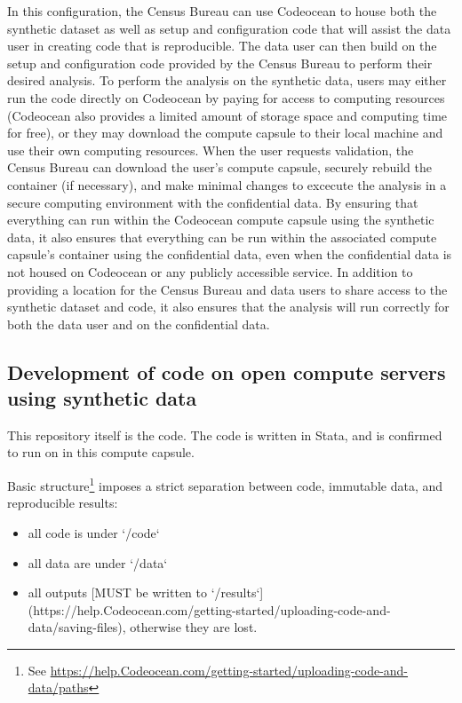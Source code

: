 \documentclass[]{hdsr}
\begin{document}
In this configuration, the Census Bureau can use Codeocean to house both the synthetic dataset as well as
setup and configuration code that will assist the data user in creating code that is reproducible. The data
user can then build on the setup and configuration code provided by the Census Bureau to perform their
desired analysis. To perform the analysis on the synthetic data, users may either run the code directly on
Codeocean by paying for access to computing resources (Codeocean also provides a limited amount of
storage space and computing time for free), or they may download the compute capsule to their local
machine and use their own computing resources. When the user requests validation, the Census
Bureau can download the user’s compute capsule, securely rebuild the container (if necessary), and make minimal changes to excecute the analysis in a
secure computing environment with the confidential data. By ensuring that everything can
run within the Codeocean compute capsule using the synthetic data, it also ensures that everything can
be run within the associated compute capsule's container using the confidential data, even when the confidential data is not housed on Codeocean or any publicly accessible service.
In addition to providing a location for the Census Bureau and data users to share access to the synthetic
dataset and code, it also ensures that the analysis will run correctly for both the data user and on the
confidential data. 



\subsection{Development of code on open compute servers using synthetic data}

This repository itself is the code. The code is written in Stata, and is confirmed to run on in this compute capsule.

Basic structure\footnote{See \url{https://help.Codeocean.com/getting-started/uploading-code-and-data/paths}} imposes a strict separation between code, immutable data, and reproducible results:

\begin{itemize}
    \item all code is under `/code`
    \item all data are under `/data`
    \item all outputs [MUST be written to `/results`](https://help.Codeocean.com/getting-started/uploading-code-and-data/saving-files), otherwise they are lost.

\end{itemize}
\end{document}
